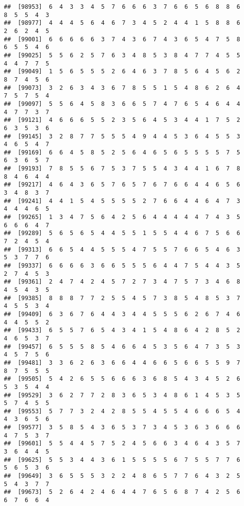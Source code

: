 \documentclass[
]{book}
\begin{document}
\begin{verbatim}
##  [98953]  6  4  3  3  4  5  7  6  6  6  3  7  6  6  5  6  8  8  6  8  5  5  4  3
##  [98977]  4  4  4  5  6  4  6  7  3  4  5  2  4  4  1  5  8  8  6  2  6  2  4  5
##  [99001]  6  6  6  6  6  3  7  4  3  6  7  4  3  6  5  4  7  5  8  6  5  5  4  6
##  [99025]  5  5  6  2  5  7  6  3  4  8  5  3  8  4  7  7  4  5  5  4  4  7  7  5
##  [99049]  1  5  6  5  5  5  2  6  4  6  3  7  8  5  6  4  5  6  2  8  7  4  5  6
##  [99073]  3  2  6  3  4  3  6  7  8  5  5  1  5  4  8  6  2  6  4  7  5  7  5  4
##  [99097]  5  5  6  4  5  8  3  6  6  5  7  4  7  6  5  4  6  4  4  4  7  7  3  7
##  [99121]  4  6  6  6  5  5  2  3  5  6  4  5  3  4  4  1  7  5  2  6  3  5  3  6
##  [99145]  3  2  8  7  7  5  5  5  4  9  4  4  5  3  6  4  5  5  3  4  6  5  4  7
##  [99169]  6  6  4  5  8  5  2  5  6  4  6  5  6  5  5  5  5  7  5  6  3  6  5  7
##  [99193]  7  8  5  5  6  7  5  3  7  5  5  4  3  4  4  1  6  7  8  8  4  6  4  4
##  [99217]  4  6  4  3  6  5  7  6  5  7  6  7  6  6  4  4  6  5  6  3  4  8  3  7
##  [99241]  4  4  1  5  4  5  5  5  5  2  7  6  6  4  4  6  4  7  3  4  4  4  6  5
##  [99265]  1  3  4  7  5  6  4  2  5  6  4  4  4  4  4  7  4  3  5  6  6  6  4  7
##  [99289]  5  6  5  6  5  4  4  5  5  1  5  5  4  4  6  7  5  6  6  7  2  4  5  4
##  [99313]  6  6  5  4  4  5  5  5  4  7  5  5  7  6  6  5  4  6  3  5  3  7  7  6
##  [99337]  6  6  6  6  3  6  6  5  5  5  6  4  4  7  5  4  4  3  5  2  7  4  5  3
##  [99361]  2  4  7  4  2  4  5  7  2  7  3  4  7  5  7  3  4  6  8  4  5  4  3  5
##  [99385]  8  8  8  7  7  2  5  5  4  5  7  3  8  5  4  8  5  3  7  4  5  5  3  4
##  [99409]  6  3  6  7  6  4  4  3  4  4  5  5  5  6  2  6  7  4  6  4  4  5  5  2
##  [99433]  6  5  5  7  6  5  4  3  4  1  5  4  8  6  4  2  8  5  2  4  6  5  3  7
##  [99457]  6  5  5  5  8  5  4  6  6  4  5  3  5  6  4  7  3  5  3  4  5  7  5  6
##  [99481]  3  3  6  2  6  3  6  6  4  4  6  6  5  6  6  5  5  9  7  8  7  5  5  5
##  [99505]  5  4  2  6  5  5  6  6  6  3  6  8  5  4  3  4  5  2  6  5  3  5  4  4
##  [99529]  3  6  2  7  7  2  8  3  6  5  3  4  8  6  1  4  5  3  5  5  7  4  5  5
##  [99553]  5  7  7  3  2  4  2  8  5  5  4  5  5  4  6  6  6  5  4  4  3  6  5  6
##  [99577]  3  5  8  5  4  3  6  5  3  7  3  4  5  3  6  3  6  6  6  4  7  5  3  7
##  [99601]  5  5  4  4  5  7  5  2  4  5  6  6  3  4  6  4  3  5  7  3  6  4  4  5
##  [99625]  5  5  3  4  4  3  6  1  5  5  5  5  6  7  5  5  7  7  6  5  6  5  3  6
##  [99649]  3  6  5  5  5  3  2  2  4  8  6  5  7  7  6  4  3  2  5  5  4  3  7  7
##  [99673]  5  2  6  4  2  4  6  4  4  7  6  5  6  8  7  4  2  5  6  6  7  6  6  4

\end{verbatim}
\end{document}
